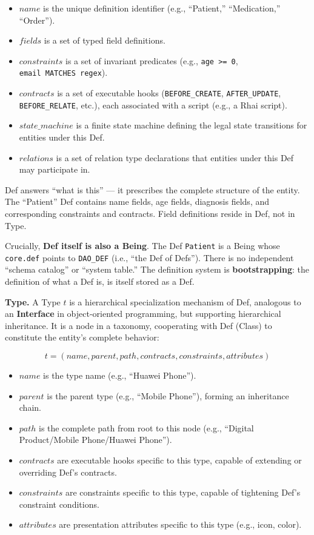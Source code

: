 \documentclass[11pt,a4paper]{article}
\begin{document}
\begin{itemize}
\tightlist
\item
  \(name\) is the unique definition identifier (e.g., ``Patient,''
  ``Medication,'' ``Order'').
\item
  \(fields\) is a set of typed field definitions.
\item
  \(constraints\) is a set of invariant predicates (e.g.,
  \texttt{age\ \textgreater{}=\ 0}, \texttt{email\ MATCHES\ regex}).
\item
  \(contracts\) is a set of executable hooks (\texttt{BEFORE\_CREATE},
  \texttt{AFTER\_UPDATE}, \texttt{BEFORE\_RELATE}, etc.), each
  associated with a script (e.g., a Rhai script).
\item
  \(state\_machine\) is a finite state machine defining the legal state
  transitions for entities under this Def.
\item
  \(relations\) is a set of relation type declarations that entities
  under this Def may participate in.
\end{itemize}

Def answers ``what is this'' --- it prescribes the complete structure of
the entity. The ``Patient'' Def contains name fields, age fields,
diagnosis fields, and corresponding constraints and contracts. Field
definitions reside in Def, not in Type.

Crucially, \textbf{Def itself is also a Being}. The Def \texttt{Patient}
is a Being whose \texttt{core.def} points to \texttt{DAO\_DEF} (i.e.,
``the Def of Defs''). There is no independent ``schema catalog'' or
``system table.'' The definition system is \textbf{bootstrapping}: the
definition of what a Def is, is itself stored as a Def.

\textbf{Type.} A Type \(t\) is a hierarchical specialization mechanism
of Def, analogous to an \textbf{Interface} in object-oriented
programming, but supporting hierarchical inheritance. It is a node in a
taxonomy, cooperating with Def (Class) to constitute the entity's
complete behavior:

\[t = (name, parent, path, contracts, constraints, attributes)\]

\begin{itemize}
\tightlist
\item
  \(name\) is the type name (e.g., ``Huawei Phone'').
\item
  \(parent\) is the parent type (e.g., ``Mobile Phone''), forming an
  inheritance chain.
\item
  \(path\) is the complete path from root to this node (e.g., ``Digital
  Product/Mobile Phone/Huawei Phone'').
\item
  \(contracts\) are executable hooks specific to this type, capable of
  extending or overriding Def's contracts.
\item
  \(constraints\) are constraints specific to this type, capable of
  tightening Def's constraint conditions.
\item
  \(attributes\) are presentation attributes specific to this type
  (e.g., icon, color).
\end{itemize}
\end{document}
